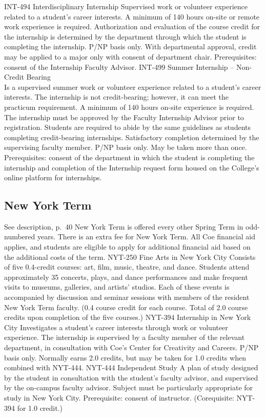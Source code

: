 \documentclass[
  letterpaper,
]{scrbook}
\begin{document}
INT-494 Interdisciplinary Internship Supervised work or volunteer
experience related to a student's career interests. A minimum of 140
hours on-site or remote work experience is required. Authorization and
evaluation of the course credit for the internship is determined by the
department through which the student is completing the internship. P/NP
basis only. With departmental approval, credit may be applied to a major
only with consent of department chair. Prerequisites: consent of the
Internship Faculty Advisor. INT-499 Summer Internship -- Non-Credit
Bearing\\
Is a supervised summer work or volunteer experience related to a
student's career interests. The internship is not credit-bearing;
however, it can meet the practicum requirement. A minimum of 140 hours
on-site experience is required. The internship must be approved by the
Faculty Internship Advisor prior to registration. Students are required
to abide by the same guidelines as students completing credit-bearing
internships. Satisfactory completion determined by the supervising
faculty member. P/NP basis only. May be taken more than once.
Prerequisites: consent of the department in which the student is
completing the internship and completion of the Internship request form
housed on the College's online platform for internships.

\subsection{New York Term}\label{new-york-term-1}

See description, p.~40 New York Term is offered every other Spring Term
in odd-numbered years. There is an extra fee for New York Term. All Coe
financial aid applies, and students are eligible to apply for additional
financial aid based on the additional costs of the term. NYT-250 Fine
Arts in New York City Consists of five 0.4-credit courses: art, film,
music, theatre, and dance. Students attend approximately 35 concerts,
plays, and dance performances and make frequent visits to museums,
galleries, and artists' studios. Each of these events is accompanied by
discussion and seminar sessions with members of the resident New York
Term faculty. (0.4 course credit for each course. Total of 2.0 course
credits upon completion of the five courses.) NYT-394 Internship in New
York City Investigates a student's career interests through work or
volunteer experience. The internship is supervised by a faculty member
of the relevant department, in consultation with Coe's Center for
Creativity and Careers. P/NP basis only. Normally earns 2.0 credits, but
may be taken for 1.0 credits when combined with NYT-444. NYT-444
Independent Study A plan of study designed by the student in
consultation with the student's faculty advisor, and supervised by the
on-campus faculty advisor. Subject must be particularly appropriate for
study in New York City. Prerequisite: consent of instructor.
(Corequisite: NYT-394 for 1.0 credit.)
\end{document}
